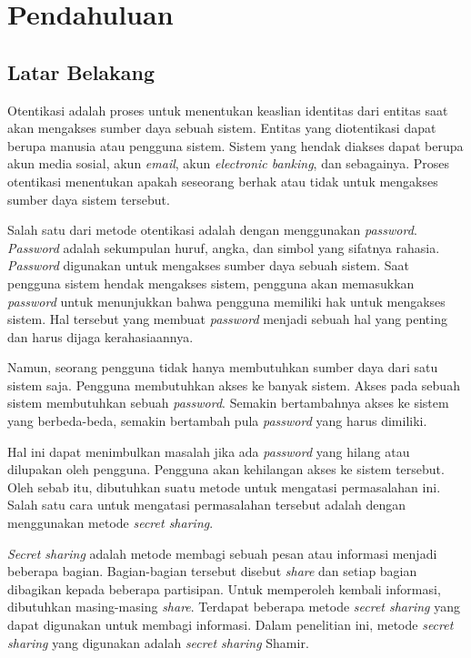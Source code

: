 \chapter{Pendahuluan}
\label{chap:Pendahuluan}

\section{Latar Belakang}
\label{sec:latar belakang}

Otentikasi adalah proses untuk menentukan keaslian identitas dari entitas saat akan mengakses sumber daya sebuah sistem. Entitas yang diotentikasi dapat berupa manusia atau pengguna sistem. Sistem yang hendak diakses dapat berupa akun media sosial, akun \textit{email}, akun \textit{electronic banking}, dan sebagainya. Proses otentikasi menentukan apakah seseorang berhak atau tidak untuk mengakses sumber daya sistem tersebut.

Salah satu dari metode otentikasi adalah dengan menggunakan \textit{password}. \textit{Password} adalah sekumpulan huruf, angka, dan simbol yang sifatnya rahasia. \textit{Password} digunakan untuk mengakses sumber daya sebuah sistem. Saat pengguna sistem hendak mengakses sistem, pengguna akan memasukkan \textit{password} untuk menunjukkan bahwa pengguna memiliki hak untuk mengakses sistem.
Hal tersebut yang membuat \textit{password} menjadi sebuah hal yang penting dan harus dijaga kerahasiaannya.

Namun, seorang pengguna tidak hanya membutuhkan sumber daya dari satu sistem saja. Pengguna membutuhkan akses ke banyak sistem. Akses pada sebuah sistem membutuhkan sebuah \textit{password}. Semakin bertambahnya akses ke sistem yang berbeda-beda, semakin bertambah pula \textit{password} yang harus dimiliki.

Hal ini dapat menimbulkan masalah jika ada \textit{password} yang hilang atau dilupakan oleh pengguna. Pengguna akan kehilangan akses ke sistem tersebut. Oleh sebab itu, dibutuhkan suatu metode untuk mengatasi permasalahan ini. Salah satu cara untuk mengatasi permasalahan tersebut adalah dengan menggunakan metode \textit{secret sharing}.

\textit{Secret sharing} adalah metode membagi sebuah pesan atau informasi menjadi beberapa bagian. Bagian-bagian tersebut disebut \textit{share} dan setiap bagian dibagikan kepada beberapa partisipan. Untuk memperoleh kembali informasi, dibutuhkan masing-masing \textit{share}. Terdapat beberapa metode \textit{secret sharing} yang dapat digunakan untuk membagi informasi. Dalam penelitian ini, metode \textit{secret sharing} yang digunakan adalah \textit{secret sharing} Shamir.

